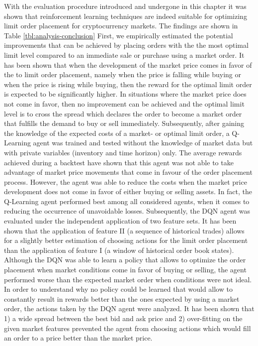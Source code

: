 With the evaluation procedure introduced and undergone in this chapter it was shown that reinforcement learning techniques are indeed suitable for optimizing limit order placement for cryptocurrency markets.
The findings are shown in Table \ref{tbl:analysis-conclusion}
First, we empirically estimated the potential improvements that can be achieved by placing orders with the the most optimal limit level compared to an immediate sale or purchase using a market order.
It has been shown that when the development of the market price comes in favor of the to limit order placement, namely when the price is falling while buying or when the price is rising while buying, then the reward for the optimal limit order is expected to be significantly higher.
In situations where the market price does not come in favor, then no improvement can be achieved and the optimal limit level is to cross the spread which declares the order to become a market order that fulfills the demand to buy or sell immediately.
Subsequently, after gaining the knowledge of the expected costs of a market- or optimal limit order, a Q-Learning agent was trained and tested without the knowledge of market data but with private variables (inventory and time horizon) only.
The average rewards achieved during a backtest have shown that this agent was not able to take advantage of market price movements that come in favour of the order placement process.
However, the agent was able to reduce the costs when the market price development does not come in favor of either buying or selling assets.
In fact, the Q-Learning agent performed best among all considered agents, when it comes to reducing the occurrence of unavoidable losses.
Subsequently, the DQN agent was evaluated under the independent application of two feature sets.
It has been shown that the application of feature II (a sequence of historical trades) allows for a slightly better estimation of choosing actions for the limit order placement than the application of feature I (a window of historical order book states).
Although the DQN was able to learn a policy that allows to optimize the order placement when market conditions come in favor of buying or selling, the agent performed worse than the expected market order when conditions were not ideal.
In order to understand why no policy could be learned that would allow to constantly result in rewards better than the ones expected by using a market order, the actions taken by the DQN agent were analyzed.
It has been shown that 1) a wide spread between the best bid and ask price and 2) over-fitting on the given market features prevented the agent from choosing actions which would fill an order to a price better than the market price.
